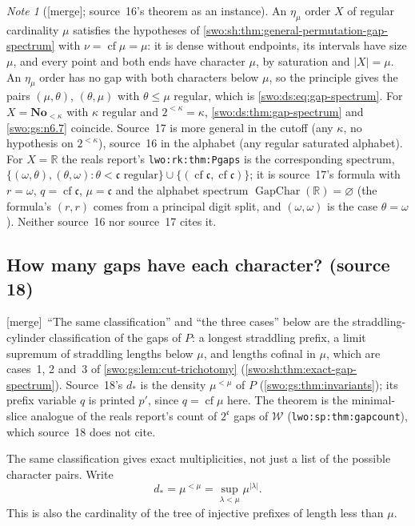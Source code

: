 \documentclass[11pt]{article}
\theoremstyle{definition}
\theoremstyle{remark}
\newtheorem{note}[note]{Note}
\newcommand{\No}{\mathbf{No}}
\newcommand{\W}{\mathcal W}
\newcommand{\cf}{\operatorname{cf}}
\newcommand{\card}[1]{\lvert #1\rvert}
\newcommand{\code}[1]{\texttt{\small #1}}
\newcommand{\merge}{\textsf{[merge]}}
\newcommand{\GapChar}{\operatorname{GapChar}}
\begin{document}
\begin{note}[\merge; source~16's theorem as an instance]\label{swo:vi:note:ds-instance}
An $\eta_\mu$ order $X$ of regular cardinality $\mu$ satisfies the hypotheses
of \cref{swo:sh:thm:general-permutation-gap-spectrum} with $\nu=\cf\mu=\mu$:
it is dense without endpoints, its intervals have size $\mu$, and every point
and both ends have character $\mu$, by saturation and $\card X=\mu$. An
$\eta_\mu$ order has no gap with both characters below $\mu$, so the principle
gives the pairs $(\mu,\theta)$, $(\theta,\mu)$ with $\theta\le\mu$ regular,
which is \eqref{swo:ds:eq:gap-spectrum}. For $X=\No_{<\kappa}$ with $\kappa$
regular and $2^{<\kappa}=\kappa$, \cref{swo:ds:thm:gap-spectrum} and
\cref{swo:gs:n6.7} coincide. Source~17 is more general in the cutoff (any
$\kappa$, no hypothesis on $2^{<\kappa}$), source~16 in the alphabet (any
regular saturated alphabet). For $X=\mathbb R$ the reals report's
\code{lwo:rk:thm:Pgaps} is the corresponding spectrum,
$\{(\omega,\theta),(\theta,\omega):\theta<\mathfrak c\text{ regular}\}
\cup\{(\cf\mathfrak c,\cf\mathfrak c)\}$; it is source~17's formula with
$r=\omega$, $q=\cf\mathfrak c$, $\mu=\mathfrak c$ and the alphabet spectrum
$\GapChar(\mathbb R)=\varnothing$ (the formula's $(r,r)$ comes from a principal
digit split, and $(\omega,\omega)$ is the case $\theta=\omega$). Neither
source~16 nor source~17 cites it.
\end{note}

\subsection{How many gaps have each character? (source 18)}
\label{swo:vi:sub:sh-mult}

\merge\ ``The same classification'' and ``the three cases'' below are the
straddling-cylinder classification of the gaps of $P$: a longest straddling
prefix, a limit supremum of straddling lengths below $\mu$, and lengths
cofinal in $\mu$, which are cases~1, 2 and~3 of \cref{swo:gs:lem:cut-trichotomy}
(\cref{swo:sh:thm:exact-gap-spectrum}). Source~18's $d_*$ is the density
$\mu^{<\mu}$ of $P$ (\cref{swo:gs:thm:invariants}); its prefix variable $q$ is
printed $p'$, since $q=\cf\mu$ here. The theorem is the minimal-slice
analogue of the reals report's count of $2^{\mathfrak c}$ gaps of $\W$
(\code{lwo:sp:thm:gapcount}), which source~18 does not cite.

The same classification gives exact multiplicities, not just a list
of the possible character pairs.  Write
\[
d_*=\mu^{<\mu}=\sup_{\lambda<\mu}\mu^{|\lambda|}.
\]
This is also the cardinality of the tree of injective prefixes of
length less than $\mu$.
\end{document}
